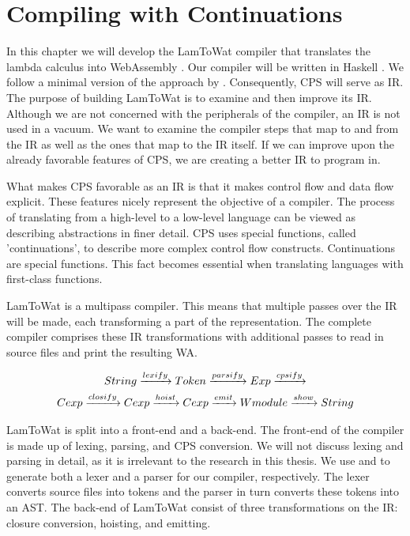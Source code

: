 
\chapter{\label{chap:cpscomp}Compiling with Continuations}
In this chapter we will develop the LamToWat compiler that translates the lambda calculus into WebAssembly \autocite{webassemblyhomepage}. Our compiler will be written in Haskell \autocite{haskellhomepage}. We follow a minimal version of the approach by \citeauthor{DBLP:books/daglib/0022396}. Consequently, \ac{CPS} will serve as \ac{IR}. The purpose of building LamToWat is to examine and then improve its \ac{IR}. Although we are not concerned with the peripherals of the compiler, an \ac{IR} is not used in a vacuum. We want to examine the compiler steps that map to and from the \ac{IR} as well as the ones that map to the \ac{IR} itself. If we can improve upon the already favorable features of \ac{CPS}, we are creating a better IR to program in.

What makes \ac{CPS} favorable as an \ac{IR} is that it makes control flow and data flow explicit. These features nicely represent the objective of a compiler. The process of translating from a high-level to a low-level language can be viewed as describing abstractions in finer detail. \ac{CPS} uses special functions, called 'continuations', to describe more complex control flow constructs. Continuations are special functions. This fact becomes essential when translating languages with first-class functions.

LamToWat is a multipass compiler. This means that multiple passes over the \ac{IR} will be made, each transforming a part of the representation. The complete compiler comprises these \ac{IR} transformations with additional passes to read in source files and print the resulting \ac{WA}.

\begin{gather*}
  String \xrightarrow{lexify} Token \xrightarrow{parsify} Exp \xrightarrow{cpsify}\\
  Cexp \xrightarrow{closify} Cexp \xrightarrow{hoist} Cexp \xrightarrow{emit} Wmodule \xrightarrow{show} String
\end{gather*}

LamToWat is split into a front-end and a back-end. The front-end of the compiler is made up of lexing, parsing, and \ac{CPS} conversion. We will not discuss lexing and parsing in detail, as it is irrelevant to the research in this thesis. We use \autocite{haskellalex} and \autocite{haskellhappy} to generate both a lexer and a parser for our compiler, respectively. The lexer converts source files into tokens and the parser in turn converts these tokens into an \ac{AST}. The back-end of LamToWat consist of three transformations on the \ac{IR}: closure conversion, hoisting, and emitting.

